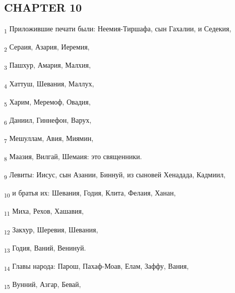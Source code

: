 \subsection{CHAPTER 10}
\begin{tcolorbox}
\textsubscript{1} Приложившие печати были: Неемия-Тиршафа, сын Гахалии, и Седекия,
\end{tcolorbox}
\begin{tcolorbox}
\textsubscript{2} Сераия, Азария, Иеремия,
\end{tcolorbox}
\begin{tcolorbox}
\textsubscript{3} Пашхур, Амария, Малхия,
\end{tcolorbox}
\begin{tcolorbox}
\textsubscript{4} Хаттуш, Шевания, Маллух,
\end{tcolorbox}
\begin{tcolorbox}
\textsubscript{5} Харим, Меремоф, Овадия,
\end{tcolorbox}
\begin{tcolorbox}
\textsubscript{6} Даниил, Гиннефон, Варух,
\end{tcolorbox}
\begin{tcolorbox}
\textsubscript{7} Мешуллам, Авия, Миямин,
\end{tcolorbox}
\begin{tcolorbox}
\textsubscript{8} Маазия, Вилгай, Шемаия: это священники.
\end{tcolorbox}
\begin{tcolorbox}
\textsubscript{9} Левиты: Иисус, сын Азании, Биннуй, из сыновей Хенадада, Кадмиил,
\end{tcolorbox}
\begin{tcolorbox}
\textsubscript{10} и братья их: Шевания, Годия, Клита, Фелаия, Ханан,
\end{tcolorbox}
\begin{tcolorbox}
\textsubscript{11} Миха, Рехов, Хашавия,
\end{tcolorbox}
\begin{tcolorbox}
\textsubscript{12} Закхур, Шеревия, Шевания,
\end{tcolorbox}
\begin{tcolorbox}
\textsubscript{13} Годия, Ваний, Венинуй.
\end{tcolorbox}
\begin{tcolorbox}
\textsubscript{14} Главы народа: Парош, Пахаф-Моав, Елам, Заффу, Вания,
\end{tcolorbox}
\begin{tcolorbox}
\textsubscript{15} Вунний, Азгар, Бевай,
\end{tcolorbox}
